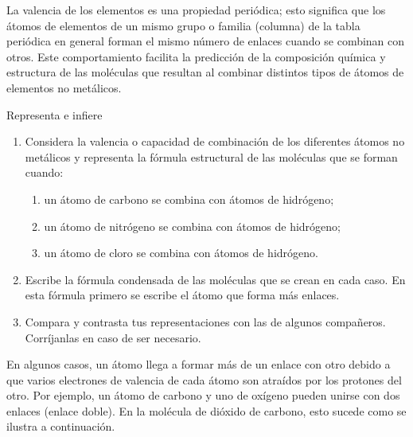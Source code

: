 \documentclass[11pt]{book}
\begin{document}
La valencia de los elementos es una propiedad periódica; esto significa que los átomos de elementos de un mismo grupo o familia (columna) de la tabla periódica en general forman el mismo número de enlaces cuando se combinan con otros. Este comportamiento facilita la predicción de la composición química y estructura de las moléculas que resultan al combinar distintos tipos de átomos de elementos no metálicos.

\begin{boxK}
  Representa e infiere
  \begin{enumerate}
    \item Considera la valencia o capacidad de combinación de los diferentes átomos no metálicos y representa la fórmula estructural de las moléculas que se forman cuando:
          \begin{enumerate}
            \item un átomo de carbono se combina con átomos de hidrógeno;
            \item un átomo de nitrógeno se combina con átomos de hidrógeno;
            \item un átomo de cloro se combina con átomos de hidrógeno.
          \end{enumerate}
    \item Escribe la fórmula condensada de las moléculas que se crean en cada caso. En esta fórmula primero se escribe el átomo que forma más enlaces.
    \item Compara y contrasta tus representaciones con las de algunos compañeros. Corríjanlas en caso de ser necesario.
  \end{enumerate}
\end{boxK}

En algunos casos, un átomo llega a formar más de un enlace con otro debido a que varios electrones de valencia de cada átomo son atraídos por los protones del otro. Por ejemplo, un átomo de carbono y uno de oxígeno pueden unirse con dos enlaces (enlace doble). En la molécula de dióxido de carbono, esto sucede como se ilustra a continuación.
\end{document}
